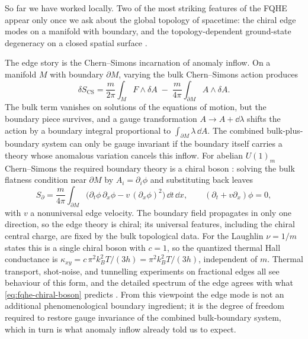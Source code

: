 So far we have worked locally. Two of the most striking features of the FQHE appear only once we ask about the global topology of spacetime: the chiral edge modes on a manifold with boundary, and the topology-dependent ground-state degeneracy on a closed spatial surface \cite{Wen1995TopologicalOrdersEdgeExcitations,WenNiu1990GroundStateDegeneracy}.

The edge story is the Chern--Simons incarnation of anomaly inflow. On a manifold $M$ with boundary $\partial M$, varying the bulk Chern--Simons action produces
\begin{equation}
  \delta S_{\mathrm{CS}}
  =
  \frac{m}{2\pi}\int_{M}F\wedge\delta A
  \;-\;
  \frac{m}{4\pi}\int_{\partial M}A\wedge\delta A.
  \label{eq:fqhe-boundary-variation}
\end{equation}
The bulk term vanishes on solutions of the equations of motion, but the boundary piece survives, and a gauge transformation $A\to A+\dd\lambda$ shifts the action by a boundary integral proportional to $\int_{\partial M}\lambda\,\dd A$. The combined bulk-plus-boundary system can only be gauge invariant if the boundary itself carries a theory whose anomalous variation cancels this inflow. For abelian $U(1)_m$ Chern--Simons the required boundary theory is a chiral boson \cite{Wen1995TopologicalOrdersEdgeExcitations}: solving the bulk flatness condition near $\partial M$ by $A_i = \partial_i\phi$ and substituting back leaves
\begin{equation}
  S_{\partial}
  =
  \frac{m}{4\pi}\int_{\partial M}
  \bigl(\partial_t\phi\,\partial_x\phi
  - v\,(\partial_x\phi)^2\bigr)\,\dd t\,\dd x,
  \qquad
  (\partial_t + v\partial_x)\phi = 0,
  \label{eq:fqhe-chiral-boson}
\end{equation}
with $v$ a nonuniversal edge velocity. The boundary field propagates in only one direction, so the edge theory is chiral; its universal features, including the chiral central charge, are fixed by the bulk topological data. For the Laughlin $\nu=1/m$ states this is a single chiral boson with $c=1$, so the quantized thermal Hall conductance is $\kappa_{xy} = c\,\pi^{2}k_{B}^{2}T/(3h) = \pi^{2}k_{B}^{2}T/(3h)$, independent of $m$. Thermal transport, shot-noise, and tunnelling experiments on fractional edges all see behaviour of this form, and the detailed spectrum of the edge agrees with what \eqref{eq:fqhe-chiral-boson} predicts \cite{Wen1995TopologicalOrdersEdgeExcitations,Witten2016ThreeLecturesTopologicalPhases}. From this viewpoint the edge mode is not an additional phenomenological boundary ingredient; it is the degree of freedom required to restore gauge invariance of the combined bulk-boundary system, which in turn is what anomaly inflow already told us to expect.

